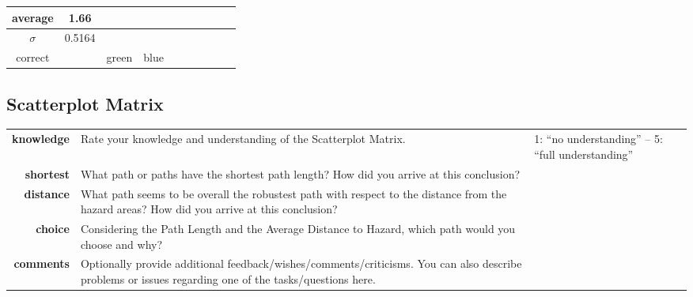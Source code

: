 \documentclass[8pt]{article}
\begin{document}
\begin{longtable}{|c|c|c|p{2.25cm}|p{2.5cm}|p{2.25cm}|p{2.25cm}|p{2.25cm}|p{2.25cm}|p{2.25cm}|}
average & 1.66 & & & & && & & \\ \hline
$\sigma$ & 0.5164 & & & & & & & & \\ \hline
correct & & green & blue & & & & & & \\ \hline
 \end{longtable}


\newpage
%
%
\subsection*{Scatterplot Matrix}
\begin{longtable}{r p{15cm} l}
\hline
\textbf{knowledge} & Rate your knowledge and understanding of the Scatterplot Matrix. & 1: ``no understanding'' -- 5: ``full understanding''	\\
\textbf{shortest} & What path or paths have the shortest path length? How did you arrive at this conclusion?\\
\textbf{distance} & What path seems to be overall the robustest path with respect to the distance from the hazard areas? How did you arrive at this conclusion? \\
\textbf{choice} & Considering the Path Length and the Average Distance to Hazard, which path would you choose and why?\\
\textbf{comments} & Optionally provide additional feedback/wishes/comments/criticisms.
You can also describe problems or issues regarding one of the tasks/questions here.\\
\hline
\end{longtable}
\end{document}
